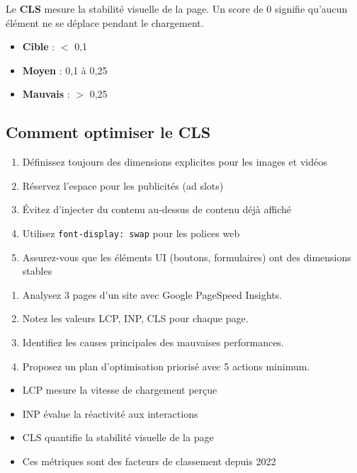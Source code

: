 \documentclass[12pt,a4paper,twoside]{report}
\newcommand{\keyword}[1]{\textbf{\textcolor{googleblue}{#1}}}
\begin{document}
Le \keyword{CLS} mesure la stabilité visuelle de la page. Un score de 0 signifie qu'aucun élément ne se déplace pendant le chargement.

\begin{itemize}
    \item \textbf{Cible} : $<$ 0,1
    \item \textbf{Moyen} : 0,1 à 0,25
    \item \textbf{Mauvais} : $>$ 0,25
\end{itemize}

\subsection{Comment optimiser le CLS}

\begin{enumerate}
    \item Définissez toujours des dimensions explicites pour les images et vidéos
    \item Réservez l'espace pour les publicités (ad slots)
    \item Évitez d'injecter du contenu au-dessus de contenu déjà affiché
    \item Utilisez \texttt{font-display: swap} pour les polices web
    \item Assurez-vous que les éléments UI (boutons, formulaires) ont des dimensions stables
\end{enumerate}


\begin{exercise}
\begin{enumerate}
    \item Analysez 3 pages d'un site avec Google PageSpeed Insights.
    \item Notez les valeurs LCP, INP, CLS pour chaque page.
    \item Identifiez les causes principales des mauvaises performances.
    \item Proposez un plan d'optimisation priorisé avec 5 actions minimum.
\end{enumerate}
\end{exercise}

\begin{takeaways}
\begin{itemize}
    \item LCP mesure la vitesse de chargement perçue
    \item INP évalue la réactivité aux interactions
    \item CLS quantifie la stabilité visuelle de la page
    \item Ces métriques sont des facteurs de classement depuis 2022
\end{itemize}
\end{takeaways}
\end{document}

